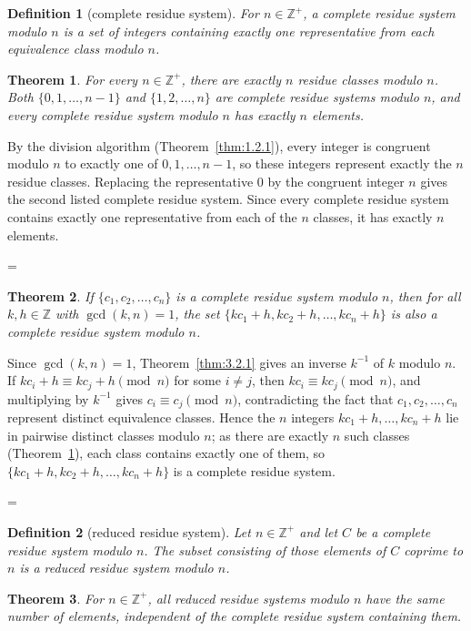 \documentclass[11pt]{article}
\makeatletter
\theoremstyle{ntstyle}
\newtheorem{theorem}{Theorem}[subsection]
\newtheorem{definition}{Definition}[subsection]
\let\nt@closedisplay\]
\def\nt@guardedclose{\@ifnextchar\par{\nt@closeafterpar}{\@ifnextchar\end{\postdisplaypenalty\@M\nt@closedisplay}{\nt@closedisplay}}}
\def\nt@closeafterpar\par{\@ifnextchar\par{\nt@closeafterpar}{\@ifnextchar\end{\postdisplaypenalty\@M\nt@closedisplay\par}{\nt@closedisplay\par}}}
\renewenvironment{proof}[1][\proofname]{\par
  \pushQED{\qed}\normalfont\topsep\medskipamount\edef\nt@afterproof{\@endparpenalty=\the\@endparpenalty\relax}\@beginparpenalty\@M\@endparpenalty\@M\let\]\nt@guardedclose\trivlist\item[]\textit{#1\@addpunct{.}} \ignorespaces}{\ifvmode\addpenalty\@M\fi\popQED\nt@afterproof\endtrivlist\@endpefalse}
\makeatother
\begin{document}
\begin{definition}[complete residue system]\label{def:3.2.3} For $n\in\mathbb{Z}^+$, a
	complete residue system modulo $n$ is a set of integers containing
	exactly one representative from each equivalence class modulo $n$.

\end{definition}
\begin{theorem}\label{thm:3.2.4} For every $n\in\mathbb{Z}^+$, there are exactly $n$ residue
	classes modulo $n$. Both $\{0,1,\ldots,n-1\}$ and
	$\{1,2,\ldots,n\}$ are complete residue systems modulo $n$, and every
	complete residue system modulo $n$ has exactly $n$ elements.

\end{theorem}

\begin{proof} By the division algorithm (Theorem~\ref{thm:1.2.1}),
	every integer is congruent modulo $n$ to exactly one of
	$0,1,\ldots,n-1$, so these integers represent exactly the $n$ residue
	classes. Replacing the representative $0$ by the congruent integer $n$
	gives the second listed complete residue system. Since every complete
	residue system contains exactly one representative from each of the $n$
	classes, it has exactly $n$ elements.

\end{proof}
\begin{theorem}\label{thm:3.2.5} If $\{c_1, c_2, \ldots, c_n\}$ is a
	complete residue system modulo $n$, then for all $k, h \in
		\mathbb{Z}$ with $\gcd(k, n) = 1$, the set $\{k c_1 + h, k c_2 + h,
		\ldots, k c_n + h\}$ is also a complete residue system modulo $n$.

\end{theorem}

\begin{proof} Since $\gcd(k, n) = 1$, Theorem~\ref{thm:3.2.1} gives
	an inverse $k^{-1}$ of $k$ modulo $n$. If $k c_i + h \equiv k c_j + h
		\pmod{n}$ for some $i \neq j$, then $k c_i \equiv k c_j \pmod{n}$, and
	multiplying by $k^{-1}$ gives $c_i \equiv c_j \pmod{n}$, contradicting
	the fact that $c_1, c_2, \ldots, c_n$ represent distinct equivalence classes.
	Hence the $n$ integers $k c_1 + h, \ldots, k c_n + h$ lie in pairwise
	distinct classes modulo $n$; as there are exactly $n$ such classes
	(Theorem~\ref{thm:3.2.4}), each class contains exactly one of them, so
	$\{kc_1 + h, kc_2 + h, \ldots, kc_n + h\}$ is a complete residue
	system.

\end{proof}
\begin{definition}[reduced residue system]\label{def:3.2.4} Let $n\in\mathbb{Z}^+$ and let $C$
	be a complete residue system modulo $n$. The subset consisting of those elements of $C$
	coprime to $n$ is a
	reduced residue system modulo $n$.

\end{definition}
\begin{theorem}\label{thm:3.2.6} For $n\in\mathbb{Z}^+$, all reduced residue systems modulo $n$ have the same number
	of elements, independent of the complete residue system containing
	them.

\end{theorem}
\end{document}
